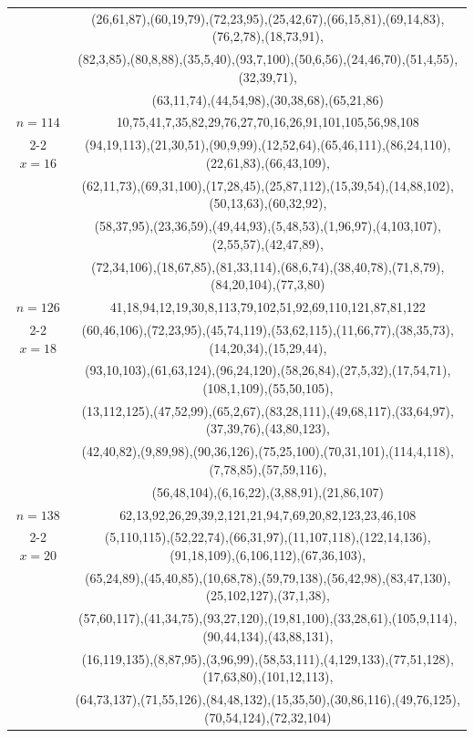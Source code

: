 \begin{tabular}{| c | c |}
&(26,61,87),(60,19,79),(72,23,95),(25,42,67),(66,15,81),(69,14,83),(76,2,78),(18,73,91),\\
&(82,3,85),(80,8,88),(35,5,40),(93,7,100),(50,6,56),(24,46,70),(51,4,55),(32,39,71),\\
&(63,11,74),(44,54,98),(30,38,68),(65,21,86)\\
\hline 
\(n=114\) & 
10,75,41,7,35,82,29,76,27,70,16,26,91,101,105,56,98,108\\
\cline{2-2}
\(x=16\)
&(94,19,113),(21,30,51),(90,9,99),(12,52,64),(65,46,111),(86,24,110),(22,61,83),(66,43,109),\\
&(62,11,73),(69,31,100),(17,28,45),(25,87,112),(15,39,54),(14,88,102),(50,13,63),(60,32,92),\\
&(58,37,95),(23,36,59),(49,44,93),(5,48,53),(1,96,97),(4,103,107),(2,55,57),(42,47,89),\\
&(72,34,106),(18,67,85),(81,33,114),(68,6,74),(38,40,78),(71,8,79),(84,20,104),(77,3,80)\\
\hline 
\(n=126\) & 
41,18,94,12,19,30,8,113,79,102,51,92,69,110,121,87,81,122\\
\cline{2-2}
\(x=18\)
&(60,46,106),(72,23,95),(45,74,119),(53,62,115),(11,66,77),(38,35,73),(14,20,34),(15,29,44),\\
&(93,10,103),(61,63,124),(96,24,120),(58,26,84),(27,5,32),(17,54,71),(108,1,109),(55,50,105),\\
&(13,112,125),(47,52,99),(65,2,67),(83,28,111),(49,68,117),(33,64,97),(37,39,76),(43,80,123),\\
&(42,40,82),(9,89,98),(90,36,126),(75,25,100),(70,31,101),(114,4,118),(7,78,85),(57,59,116),\\
&(56,48,104),(6,16,22),(3,88,91),(21,86,107)\\
\hline 
\(n=138\) & 
62,13,92,26,29,39,2,121,21,94,7,69,20,82,123,23,46,108\\
\cline{2-2}
\(x=20\)
&(5,110,115),(52,22,74),(66,31,97),(11,107,118),(122,14,136),(91,18,109),(6,106,112),(67,36,103),\\
&(65,24,89),(45,40,85),(10,68,78),(59,79,138),(56,42,98),(83,47,130),(25,102,127),(37,1,38),\\
&(57,60,117),(41,34,75),(93,27,120),(19,81,100),(33,28,61),(105,9,114),(90,44,134),(43,88,131),\\
&(16,119,135),(8,87,95),(3,96,99),(58,53,111),(4,129,133),(77,51,128),(17,63,80),(101,12,113),\\
&(64,73,137),(71,55,126),(84,48,132),(15,35,50),(30,86,116),(49,76,125),(70,54,124),(72,32,104)\\
\hline 
\end{tabular}